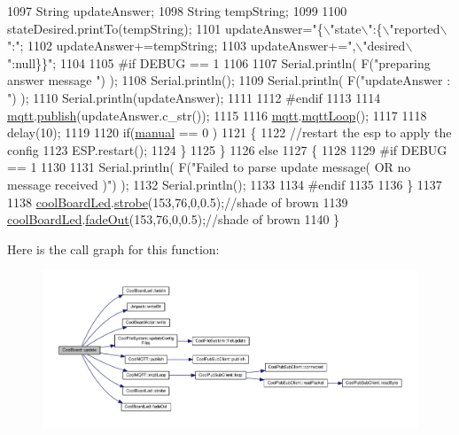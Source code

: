 \begin{DoxyCode}
1097             String updateAnswer;
1098             String tempString;
1099             
1100             stateDesired.printTo(tempString);
1101             updateAnswer=\textcolor{stringliteral}{"\{\(\backslash\)"state\(\backslash\)":\{\(\backslash\)"reported\(\backslash\)":"};
1102             updateAnswer+=tempString;
1103             updateAnswer+=\textcolor{stringliteral}{",\(\backslash\)"desired\(\backslash\)":null\}\}"};
1104 
1105 \textcolor{preprocessor}{        #if DEBUG == 1}
1106 
1107             Serial.println( F(\textcolor{stringliteral}{"preparing answer message "}) );
1108             Serial.println();
1109             Serial.println( F(\textcolor{stringliteral}{"updateAnswer : "}) );
1110             Serial.println(updateAnswer);
1111         
1112 \textcolor{preprocessor}{        #endif  }
1113 
1114             \hyperlink{class_cool_board_a2399f44d7c23c1149a335cb3b46d90f1}{mqtt}.\hyperlink{class_cool_m_q_t_t_ace977b3e90ab14b1199fe5c4fb0a13ec}{publish}(updateAnswer.c\_str());
1115             
1116             \hyperlink{class_cool_board_a2399f44d7c23c1149a335cb3b46d90f1}{mqtt}.\hyperlink{class_cool_m_q_t_t_aa5eaae967b562b62cbcf2b8d81f6e5d5}{mqttLoop}();
1117 
1118             delay(10);
1119         
1120             \textcolor{keywordflow}{if}(\hyperlink{class_cool_board_a7c8e505a5804b109e112d5a03df6ea2b}{manual} == 0 )
1121             \{
1122                 \textcolor{comment}{//restart the esp to apply the config}
1123                 ESP.restart();
1124             \}
1125     \}
1126     \textcolor{keywordflow}{else}
1127     \{
1128     
1129 \textcolor{preprocessor}{    #if DEBUG == 1}
1130 
1131         Serial.println( F(\textcolor{stringliteral}{"Failed to parse update message( OR no message received )"}) );
1132         Serial.println();
1133     
1134 \textcolor{preprocessor}{    #endif}
1135     
1136     \}
1137 
1138     \hyperlink{class_cool_board_a1b1d3c684a5baa56b08486e192fd8e97}{coolBoardLed}.\hyperlink{class_cool_board_led_ad5f0de4c628cbfbf49896042831c64ad}{strobe}(153,76,0,0.5);\textcolor{comment}{//shade of brown}
1139     \hyperlink{class_cool_board_a1b1d3c684a5baa56b08486e192fd8e97}{coolBoardLed}.\hyperlink{class_cool_board_led_a93d545679237e8cc858324367149775c}{fadeOut}(153,76,0,0.5);\textcolor{comment}{//shade of brown                              }
1140 \}
\end{DoxyCode}
Here is the call graph for this function\+:
\nopagebreak
\begin{figure}[H]
\begin{center}
\leavevmode
\includegraphics[width=350pt]{d7/df9/class_cool_board_a8612756d3f73198cdde857a66f0fe690_cgraph}
\end{center}
\end{figure}
